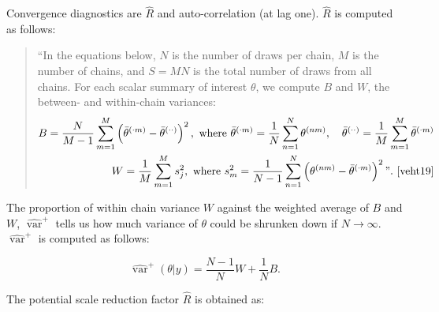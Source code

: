 \documentclass[article]{jss}
\begin{document}

Convergence diagnostics are $\widehat{R}$ and auto-correlation (at lag one). $\widehat{R}$ is computed as follows: %

\begin{quotation}
``In the equations below, $N$ is the number of draws per chain, $M$ is the number of chains, and $S = MN$ is the total number of draws from all chains. For each scalar summary of interest $\theta$, we compute $B$ and $W$, the between- and within-chain variances:
%
\begin{align*}
B=\frac{N}{M-1} \sum_{m=1}^{M}\left(\bar{\theta}^{(\cdot m)}-\bar{\theta}^{(\cdot \cdot)}\right)^{2}, \text { where } \bar{\theta}^{(\cdot m)}=\frac{1}{N} \sum_{n=1}^{N} \theta^{(n m)}, \quad \bar{\theta}^{(\cdot \cdot)}=\frac{1}{M} \sum_{m=1}^{M} \bar{\theta}^{(\cdot m)} \\
W=\frac{1}{M} \sum_{m=1}^{M} s_{j}^{2},  \text { where } s_{m}^{2}=\frac{1}{N-1} \sum_{n=1}^{N}\left(\theta^{(n m)}-\bar{\theta}^{(\cdot m)}\right)^{2}". \text{ \cite[p.~5]{veht19}} 
\end{align*}
%
\end{quotation}

The proportion of within chain variance $W$ against the weighted average of $B$ and $W$, $\widehat{\operatorname{var}}^{+}$ tells us how much variance of $\theta$ could be shrunken down if $N\to\infty$. $\widehat{\operatorname{var}}^{+}$ is computed as follows: %

\begin{equation*}
\widehat{\operatorname{var}}^{+}(\theta | y)=\frac{N-1}{N} W+\frac{1}{N} B.
\end{equation*}

The potential scale reduction factor $\widehat{R}$ is obtained as:
\end{document}
